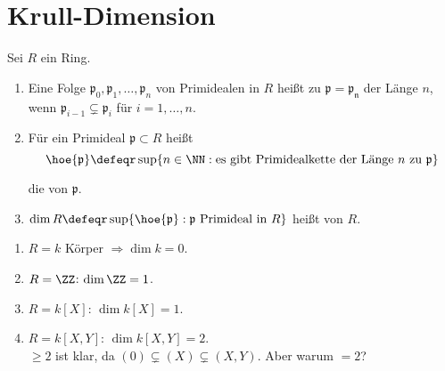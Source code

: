 \section{Krull-Dimension}

\begin{Def}
\label{2.24}
Sei $R$ ein Ring. 
\begin{enumerate}

\item Eine Folge $\mathfrak{p}_0, \mathfrak{p}_1, \dots ,\mathfrak{p}_n$
von Primidealen in $R$ hei\ss t  zu $\mathfrak{p}=\mathfrak{p_n}$
der L\"ange $n$, wenn $\mathfrak{p}_{i-1}\subsetneq \mathfrak{p}_i$ f\"ur $i=1,\ldots, n$.

\item F\"ur ein Primideal $\mathfrak{p}\subset R$ hei\ss t
$$ \hoe{\mathfrak{p}}\defeqr\sup\{n\in\NN:
\text{es gibt Primidealkette der L\"ange}\ n\ \text{zu}\ \mathfrak{p}\} $$

die 
von $\mathfrak{p}$.

\item $\dim{R} \defeqr\sup\{\hoe{\mathfrak{p}}:\mathfrak{p}
\text{ Primideal in }R\}$
hei\ss t  von $R$.

\end{enumerate}
\end{Def}


\begin{nnBsp}
\begin{enumerate}
\item $R=k$ K\"orper $\Rightarrow \dim{k}=0$.
\item $R=\ZZ$: $\dim{\ZZ}=1$.
\item $R=k[X]$: $\dim{k[X]} =1$.
\item $R=k[X,Y]$: $\dim{k[X,Y]} =2$.\\
$\geq 2$ ist klar, da $(0)\subsetneq(X)\subsetneq(X,Y)$. Aber warum $=2$?
\end{enumerate}
\end{nnBsp}

